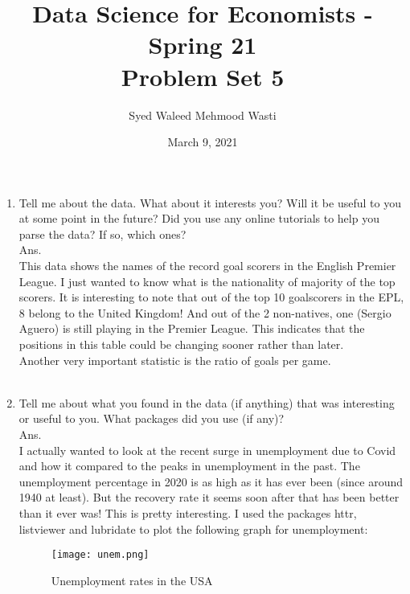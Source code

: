 \documentclass[12pt]{article}
\title{\textbf{Data Science for Economists - Spring 21 \\
\vspace{0.5cm}
Problem Set 5}}
\author{Syed Waleed Mehmood Wasti}
\date{March 9, 2021}
\begin{document}
\begin{titlepage}
\maketitle
\thispagestyle{empty}
\end{titlepage}

\begin{enumerate}
\item
Tell me about the data. What about it
interests you? Will it be useful to you at some point in the future? Did you use
any online tutorials to help you parse the data? If so, which ones? \\

Ans. \\
This data shows the names of the record goal scorers in the English Premier League. I just wanted to know what is the nationality of majority of the top scorers. It is interesting to note that out of the top 10 goalscorers in the EPL, 8 belong to the United Kingdom! And out of the 2 non-natives, one (Sergio Aguero) is still playing in the Premier League. This indicates that the positions in this table could be changing sooner rather than later.\\

Another very important statistic is the ratio of goals per game. \\\\

\item
Tell me about what you found in the data (if anything) that was interesting or useful to you. What packages did you use (if any)? \\

Ans. \\
I actually wanted to look at the recent surge in unemployment due to Covid and how it compared to the peaks in unemployment in the past. The unemployment percentage in 2020 is as high as it has ever been (since around 1940 at least). But the recovery rate it seems soon after that has been better than it ever was! This is pretty interesting. I used the packages httr, listviewer and lubridate to plot the following graph for unemployment: \\

\begin{figure}[H]
    \centering
    \texttt{[image: unem.png]}
    \caption{Unemployment rates in the USA}
    \label{fig:my_label}
\end{figure}





\end{enumerate}
\end{document}
